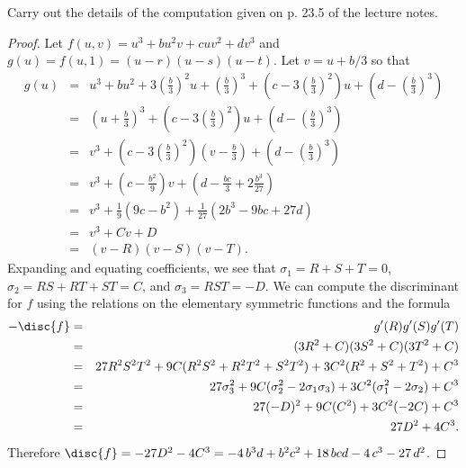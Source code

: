 \documentclass[10pt]{amsart}
\begin{document}
\begin{thm}[5 Points]
  Carry out the details of the computation given on p. 23.5 of the lecture notes.

  \begin{proof}
    Let $f(u,v) = u^3 + bu^2v + cuv^2 + dv^3$ and $g(u) = f(u,1) = (u - r)(u - s)(u - t)$.
    Let $v = u + b/3$ so that
    \begin{eqnarray*}
      g(u) &=& u^3 + bu^2 + 3\left(\frac{b}{3}\right)^2u + \left(\frac{b}{3}\right)^3 + \left(c - 3\left(\frac{b}{3}\right)^2\right)u  + \left(d - \left(\frac{b}{3}\right)^3\right)\\
      &=& \left(u + \frac{b}{3}\right)^3 + \left(c - 3\left(\frac{b}{3}\right)^2\right)u + \left(d - \left(\frac{b}{3}\right)^3\right)\\
      &=& v^3 + \left(c - 3\left(\frac{b}{3}\right)^2\right)\left(v - \frac{b}{3}\right) + \left(d - \left(\frac{b}{3}\right)^3\right)\\
      &=& v^3 + \left(c - \frac{b^2}{9}\right)v + \left(d - \frac{bc}{3} + 2\frac{b^3}{27}\right)\\
      &=& v^3 + \frac{1}{9}\left(9c - b^2\right) + \frac{1}{27}\left(2b^3 - 9bc + 27d\right)\\
      &=& v^3 + Cv + D\\
      &=& (v - R)(v - S)(v - T).
    \end{eqnarray*}
    Expanding and equating coefficients, we see that $\sigma_1 = R + S + T = 0$, $\sigma_2 = RS + RT + ST = C$, and $\sigma_3 = RST = - D$.
    We can compute the discriminant for $f$ using the relations on the elementary symmetric functions and the formula
    \begin{eqnarray*}
      -\disc{f} &=& g^\prime(R)g^\prime(S)g^\prime(T)\\
      &=& (3R^2 + C)(3S^2 + C)(3T^2 + C)\\
      &=& 27R^2S^2T^2 + 9C(R^2S^2 + R^2T^2 + S^2T^2) + 3C^2(R^2 + S^2 + T^2) + C^3\\
      &=& 27\sigma_3^2 + 9C(\sigma_2^2 - 2\sigma_1\sigma_3) + 3C^2(\sigma_1^2 - 2\sigma_2) + C^3\\
      &=& 27(-D)^2 + 9C(C^2) + 3C^2(-2C) + C^3\\
      &=& 27D^2 + 4C^3.
    \end{eqnarray*}
    Therefore $\disc{f} = -27D^2 - 4C^3 = -4 \, b^{3} d + b^{2} c^{2} + 18 \, b c d - 4 \, c^{3} - 27 \, d^{2}$.
  \end{proof}
\end{thm}
\end{document}
